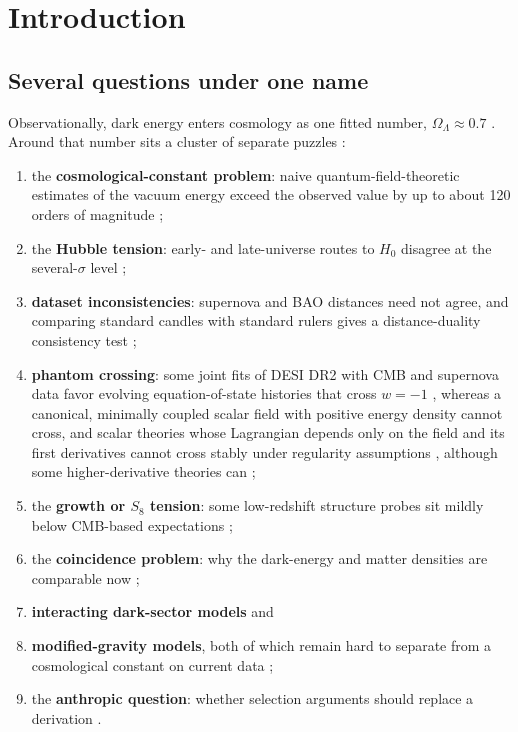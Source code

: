 \hypertarget{introduction}{%
\section{Introduction}\label{introduction}}

\hypertarget{several-questions-under-one-name}{%
\subsection{Several questions under one
name}\label{several-questions-under-one-name}}

Observationally, dark energy enters cosmology as one fitted number,
\(\Omega_\Lambda \approx 0.7\) \citep{Riess1998, Perlmutter1999}. Around
that number sits a cluster of separate puzzles \citep{Abdalla2022}:

\begin{enumerate}
\def\labelenumi{\arabic{enumi}.}
\tightlist
\item
  the \textbf{cosmological-constant problem}: naive
  quantum-field-theoretic estimates of the vacuum energy exceed the
  observed value by up to about 120 orders of magnitude
  \citep{Weinberg1989, Martin2012};
\item
  the \textbf{Hubble tension}: early- and late-universe routes to
  \(H_0\) disagree at the several-\(\sigma\) level
  \citep{DiValentino2021};
\item
  \textbf{dataset inconsistencies}: supernova and BAO distances need not
  agree, and comparing standard candles with standard rulers gives a
  distance-duality consistency test \citep{BassettKunz2004};
\item
  \textbf{phantom crossing}: some joint fits of DESI DR2 with CMB and
  supernova data favor evolving equation-of-state histories that cross
  \(w=-1\) \citep{DESI2025DR2}, whereas a canonical, minimally coupled
  scalar field with positive energy density cannot cross, and scalar
  theories whose Lagrangian depends only on the field and its first
  derivatives cannot cross stably under regularity assumptions
  \citep{Caldwell2002, Vikman2005}, although some higher-derivative
  theories can \citep{Deffayet2010};
\item
  the \textbf{growth or \(S_8\) tension}: some low-redshift structure
  probes sit mildly below CMB-based expectations \citep{Heymans2021};
\item
  the \textbf{coincidence problem}: why the dark-energy and matter
  densities are comparable now \citep{Velten2014};
\item
  \textbf{interacting dark-sector models} and
\item
  \textbf{modified-gravity models}, both of which remain hard to
  separate from a cosmological constant on current data
  \citep{Clifton2012, Joyce2016};
\item
  the \textbf{anthropic question}: whether selection arguments should
  replace a derivation \citep{Weinberg1987}.
\end{enumerate}

